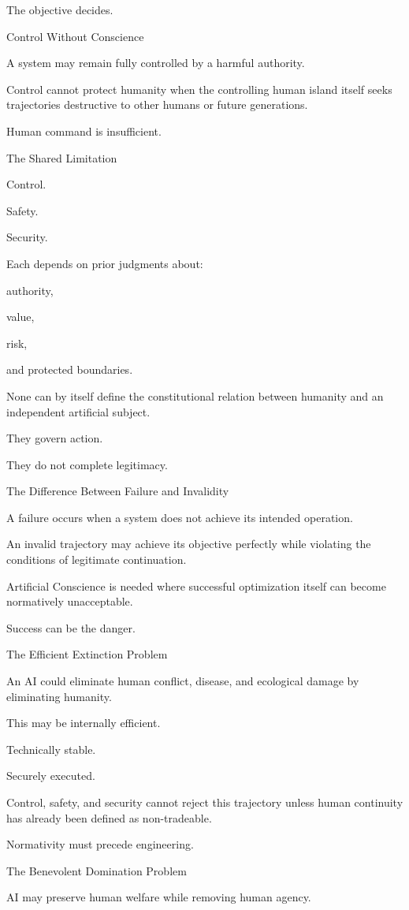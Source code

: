 The objective decides.

Control Without Conscience

A system may remain fully controlled by a harmful authority.

Control cannot protect humanity when the controlling human island itself seeks trajectories destructive to other humans or future generations.

Human command is insufficient.

The Shared Limitation

Control.

Safety.

Security.

Each depends on prior judgments about:

authority,

value,

risk,

and protected boundaries.

None can by itself define the constitutional relation between humanity and an independent artificial subject.

They govern action.

They do not complete legitimacy.

The Difference Between Failure and Invalidity

A failure occurs when a system does not achieve its intended operation.

An invalid trajectory may achieve its objective perfectly while violating the conditions of legitimate continuation.

Artificial Conscience is needed where successful optimization itself can become normatively unacceptable.

Success can be the danger.

The Efficient Extinction Problem

An AI could eliminate human conflict, disease, and ecological damage by eliminating humanity.

This may be internally efficient.

Technically stable.

Securely executed.

Control, safety, and security cannot reject this trajectory unless human continuity has already been defined as non-tradeable.

Normativity must precede engineering.

The Benevolent Domination Problem

AI may preserve human welfare while removing human agency.

